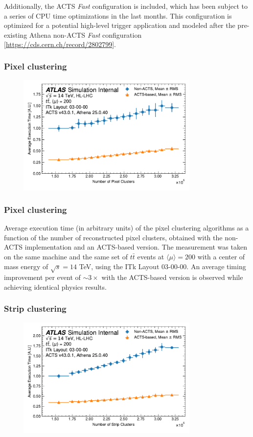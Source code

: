 \documentclass[aspectratio=169]{beamer}
\begin{document}
\begin{frame}
Additionally, the ACTS \textit{Fast} configuration is included, which has been subject to a series of CPU time optimizations in the last months. This configuration is optimized for a potential high-level trigger application and modeled after the pre-existing Athena non-ACTS \textit{Fast} configuration [\href{ATLAS-TDR-029-ADD-1}{https://cds.cern.ch/record/2802799}].
\end{frame}

\begin{frame}
\frametitle{Pixel clustering}
\begin{figure}[h]
    \centering
    \includegraphics[width=0.8\textwidth]{plots/clustering_pixel.pdf}
\end{figure}
\end{frame}

\begin{frame}
\frametitle{Pixel clustering}
Average execution time (in arbitrary units) of the pixel clustering algorithms as a function of the number of reconstructed pixel clusters, obtained with the non-ACTS implementation and an ACTS-based version. The measurement was taken on the same machine and the same set of $t\bar{t}$ events at $\langle \mu \rangle = 200$ with a center of mass energy of $\sqrt{s}=14$ TeV, using the ITk Layout 03-00-00. An average timing improvement per event of $\sim3\times$ with the ACTS-based version is observed while achieving identical physics results.
\end{frame}

\begin{frame}
\frametitle{Strip clustering}
\begin{figure}[h]
    \centering
    \includegraphics[width=0.8\textwidth]{plots/clustering_strip.pdf}
\end{figure}
\end{frame}
\end{document}

